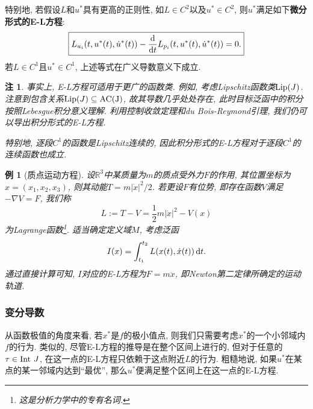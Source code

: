 \documentclass[12pt,a4paper]{article}
\newtheorem{example}[theorem]{例}
\newtheorem{remark}[theorem]{注}
\begin{document}
特别地, 若假设$L$和$u^*$具有更高的正则性, 如$L \in C^2$以及$u^* \in C^2$, 则$u^*$满足如下\textbf{微分形式的E-L方程}:
\begin{equation*}
    \boxed{L_{u_i}(t, u^*(t), \dot{u}^*(t)) - \frac{{\rm d}}{{\rm d}t}L_{p_i}(t, u^*(t), \dot{u}^*(t)) = 0.}
\end{equation*}
若$L \in C^1$且$u^* \in C^1$, 上述等式在广义导数意义下成立.

\begin{remark}
    事实上, E-L方程可适用于更广的函数类. 例如, 考虑Lipschitz函数类${\rm Lip}(J)$.
    注意到包含关系${\rm Lip}(J) \subseteq {\rm AC(J)}$, 故其导数几乎处处存在, 此时目标泛函中的积分按照Lebesgue积分意义理解.
    利用控制收敛定理和du Bois-Reymond引理, 我们仍可以导出积分形式的E-L方程. 
    
    特别地, 逐段$C^1$的函数是Lipschitz连续的, 因此积分形式的E-L方程对于逐段$C^1$的连续函数也成立.
\end{remark}

\begin{example}[质点运动方程]
    设$\mathbb{R}^3$中某质量为$m$的质点受外力$F$的作用, 其位置坐标为$x = (x_1, x_2, x_3)$, 则其动能$T = m|\dot x|^2/2$.
    若更设$F$有位势, 即存在函数$V$满足$-\nabla V = F$, 我们称
    \begin{equation*}
        L := T - V = \frac{1}{2}m|\dot x|^2 - V(x)
    \end{equation*}  
    为Lagrange函数\footnote{这是分析力学中的专有名词.}. 适当确定定义域$M$, 考虑泛函
    \begin{equation*}
        I(x) = \int_{t_1}^{t_2} L(x(t), \dot x(t)) \,{\rm d}t.
    \end{equation*}
    通过直接计算可知, $I$对应的E-L方程为$F = m\ddot x$, 即Newton第二定律所确定的运动轨道.
\end{example}

\subsubsection{变分导数}

从函数极值的角度来看, 若$x^*$是$f$的极小值点, 则我们只需要考虑$x^*$的一个小邻域内$f$的行为.
类似的, 尽管E-L方程的推导是在整个区间上进行的, 但对于任意的$\tau \in {\rm Int}\ J$, 在这一点的E-L方程只依赖于这点附近$L$的行为.
粗糙地说, 如果$u^*$在某点的某一邻域内达到``最优'', 那么$u^*$便满足整个区间上在这一点的E-L方程.
\end{document}
